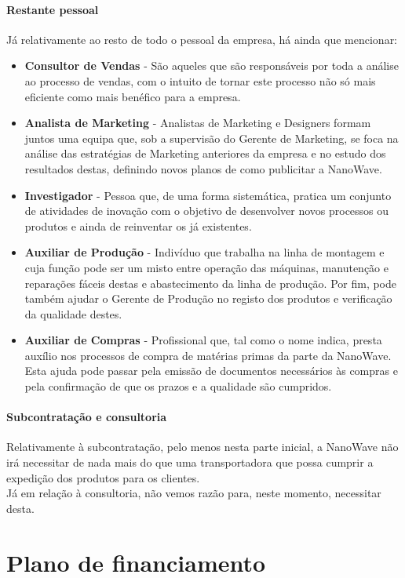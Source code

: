 \documentclass[a4paper]{article}
\begin{document}
\subsection{Restante pessoal}
Já relativamente ao resto de todo o pessoal da empresa, há ainda que mencionar:
\begin{itemize}
    \item \textbf{Consultor de Vendas} - São aqueles que são responsáveis por toda a análise ao processo de vendas, com o intuito de tornar este processo não só mais eficiente como mais benéfico para a empresa. 
    \item \textbf{Analista de Marketing} - Analistas de Marketing e Designers formam juntos uma equipa que, sob a supervisão do Gerente de Marketing, se foca na análise das estratégias de Marketing anteriores da empresa e no estudo dos resultados destas, definindo novos planos de como publicitar a NanoWave.
    \item \textbf{Investigador} - Pessoa que, de uma forma sistemática, pratica um conjunto de atividades de inovação com o objetivo de desenvolver novos processos ou produtos e ainda de reinventar os já existentes.
    \item \textbf{Auxiliar de Produção} - Indivíduo que trabalha na linha de montagem e cuja função pode ser um misto entre operação das máquinas, manutenção e reparações fáceis destas e abastecimento da linha de produção. Por fim, pode também ajudar o Gerente de Produção no registo dos produtos e verificação da qualidade destes.
    \item \textbf{Auxiliar de Compras} - Profissional que, tal como o nome indica, presta auxílio nos processos de compra de matérias primas da parte da NanoWave. Esta ajuda pode passar pela emissão de documentos necessários às compras e pela confirmação de que os prazos e a qualidade são cumpridos.
\end{itemize}

\subsection{Subcontratação e consultoria}
Relativamente à subcontratação, pelo menos nesta parte inicial, a NanoWave não irá necessitar de nada mais do que uma transportadora que possa cumprir a expedição dos produtos para os clientes.\\
Já em relação à consultoria, não vemos razão para, neste momento, necessitar desta.


\part{Plano de financiamento}
\end{document}
